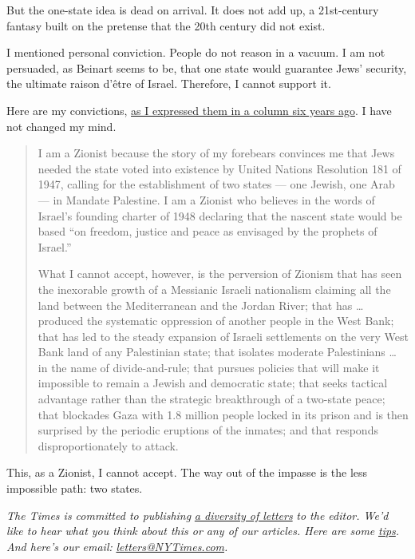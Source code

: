 But the one-state idea is dead on arrival. It does not add up, a
21st-century fantasy built on the pretense that the 20th century did not
exist.

I mentioned personal conviction. People do not reason in a vacuum. I am
not persuaded, as Beinart seems to be, that one state would guarantee
Jews' security, the ultimate raison d'être of Israel. Therefore, I
cannot support it.

Here are my convictions,
\href{https://www.nytimes3xbfgragh.onion/2014/07/30/opinion/roger-cohen-zionism-and-israels-war-with-hamas-in-gaza.html}{as
I expressed them in a column six years ago}. I have not changed my mind.

\begin{quote}
I am a Zionist because the story of my forebears convinces me that Jews
needed the state voted into existence by United Nations Resolution 181
of 1947, calling for the establishment of two states --- one Jewish, one
Arab --- in Mandate Palestine. I am a Zionist who believes in the words
of Israel's founding charter of 1948 declaring that the nascent state
would be based ``on freedom, justice and peace as envisaged by the
prophets of Israel.''

What I cannot accept, however, is the perversion of Zionism that has
seen the inexorable growth of a Messianic Israeli nationalism claiming
all the land between the Mediterranean and the Jordan River; that has
\ldots{} produced the systematic oppression of another people in the
West Bank; that has led to the steady expansion of Israeli settlements
on the very West Bank land of any Palestinian state; that isolates
moderate Palestinians \ldots{} in the name of divide-and-rule; that
pursues policies that will make it impossible to remain a Jewish and
democratic state; that seeks tactical advantage rather than the
strategic breakthrough of a two-state peace; that blockades Gaza with
1.8 million people locked in its prison and is then surprised by the
periodic eruptions of the inmates; and that responds disproportionately
to attack.
\end{quote}

This, as a Zionist, I cannot accept. The way out of the impasse is the
less impossible path: two states.

\emph{The Times is committed to publishing}
\href{https://www.nytimes3xbfgragh.onion/2019/01/31/opinion/letters/letters-to-editor-new-york-times-women.html}{\emph{a
diversity of letters}} \emph{to the editor. We'd like to hear what you
think about this or any of our articles. Here are some}
\href{https://help.nytimes3xbfgragh.onion/hc/en-us/articles/115014925288-How-to-submit-a-letter-to-the-editor}{\emph{tips}}\emph{.
And here's our email:}
\href{mailto:letters@NYTimes.com}{\emph{letters@NYTimes.com}}\emph{.}

